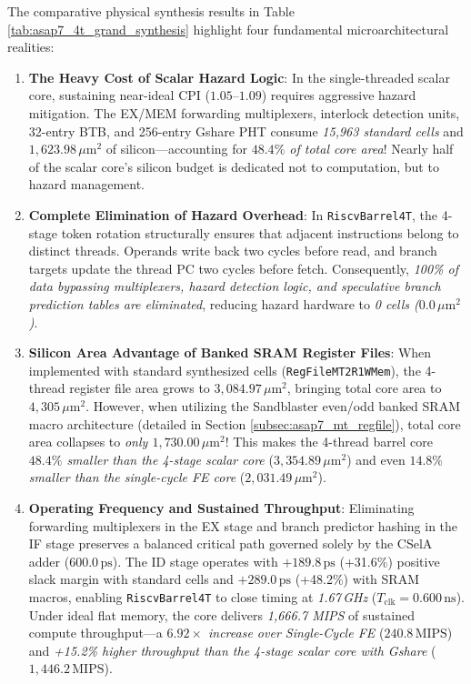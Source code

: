 The comparative physical synthesis results in Table \ref{tab:asap7_4t_grand_synthesis} highlight four fundamental microarchitectural realities:
\begin{enumerate}
    \item \textbf{The Heavy Cost of Scalar Hazard Logic}: In the single-threaded scalar core, sustaining near-ideal CPI ($1.05\text{--}1.09$) requires aggressive hazard mitigation. The EX/MEM forwarding multiplexers, interlock detection units, 32-entry BTB, and 256-entry Gshare PHT consume \textit{15,963 standard cells} and \textit{$1,623.98\,\mu\text{m}^2$} of silicon---accounting for \textit{$48.4\%$ of total core area}! Nearly half of the scalar core's silicon budget is dedicated not to computation, but to hazard management.
    \item \textbf{Complete Elimination of Hazard Overhead}: In \texttt{RiscvBarrel4T}, the 4-stage token rotation structurally ensures that adjacent instructions belong to distinct threads. Operands write back two cycles before read, and branch targets update the thread PC two cycles before fetch. Consequently, \textit{100\% of data bypassing multiplexers, hazard detection logic, and speculative branch prediction tables are eliminated}, reducing hazard hardware to \textit{0 cells ($0.0\,\mu\text{m}^2$)}.
    \item \textbf{Silicon Area Advantage of Banked SRAM Register Files}: When implemented with standard synthesized cells (\texttt{RegFileMT2R1WMem}), the 4-thread register file area grows to $3,084.97\,\mu\text{m}^2$, bringing total core area to $4,305\,\mu\text{m}^2$. However, when utilizing the Sandblaster even/odd banked SRAM macro architecture \cite{glossner2003sandblaster} (detailed in Section \ref{subsec:asap7_mt_regfile}), total core area collapses to \textit{only $1,730.00\,\mu\text{m}^2$}! This makes the 4-thread barrel core \textit{$48.4\%$ smaller than the 4-stage scalar core} ($3,354.89\,\mu\text{m}^2$) and even \textit{$14.8\%$ smaller than the single-cycle FE core} ($2,031.49\,\mu\text{m}^2$).
    \item \textbf{Operating Frequency and Sustained Throughput}: Eliminating forwarding multiplexers in the EX stage and branch predictor hashing in the IF stage preserves a balanced critical path governed solely by the CSelA adder ($600.0\,\text{ps}$). The ID stage operates with $+189.8\,\text{ps}$ (+31.6\%) positive slack margin with standard cells and $+289.0\,\text{ps}$ (+48.2\%) with SRAM macros, enabling \texttt{RiscvBarrel4T} to close timing at \textit{1.67\,GHz} ($T_{\text{clk}} = 0.600\,\text{ns}$). Under ideal flat memory, the core delivers \textit{1,666.7 MIPS} of sustained compute throughput---a \textit{$6.92\times$ increase over Single-Cycle FE} ($240.8\,\text{MIPS}$) and \textit{+15.2\% higher throughput than the 4-stage scalar core with Gshare} ($1,446.2\,\text{MIPS}$).
\end{enumerate}


